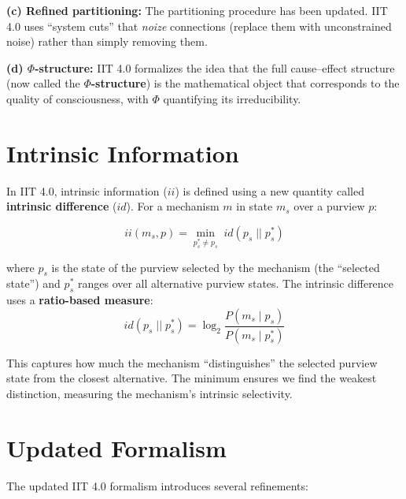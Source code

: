 \documentclass[11pt,a4paper]{report}
\newcommand{\Phi}{\varPhi}
\begin{document}
\textbf{(c) Refined partitioning:} The partitioning procedure has been updated. IIT 4.0 uses ``system cuts'' that \emph{noize} connections (replace them with unconstrained noise) rather than simply removing them.

\textbf{(d) $\Phi$-structure:} IIT 4.0 formalizes the idea that the full cause--effect structure (now called the \textbf{$\Phi$-structure}) is the mathematical object that corresponds to the quality of consciousness, with $\Phi$ quantifying its irreducibility.

\section{Intrinsic Information}

In IIT 4.0, intrinsic information ($ii$) is defined using a new quantity called \textbf{intrinsic difference} ($id$). For a mechanism $m$ in state $m_s$ over a purview $p$:

\begin{mathbox}
\vspace{-8pt}
\[
  ii(m_s, p) = \min_{p_s^* \neq p_s} \; id(p_s \;||\; p_s^*)
\]
\vspace{-10pt}
\end{mathbox}

where $p_s$ is the state of the purview selected by the mechanism (the ``selected state'') and $p_s^*$ ranges over all alternative purview states. The intrinsic difference uses a \textbf{ratio-based measure}:
\[
  id(p_s \;||\; p_s^*) = \log_2 \frac{P(m_s \mid p_s)}{P(m_s \mid p_s^*)}
\]

This captures how much the mechanism ``distinguishes'' the selected purview state from the closest alternative. The minimum ensures we find the weakest distinction, measuring the mechanism's intrinsic selectivity.

\section{Updated Formalism}

The updated IIT 4.0 formalism introduces several refinements:
\end{document}
